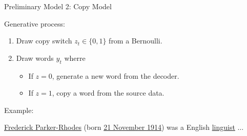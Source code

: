 



\begin{frame}{Preliminary Model 2: Copy Model}

Generative process:
\begin{enumerate}
\item Draw copy switch $z_t \in \{0, 1\}$ from a Bernoulli.
\item Draw words $y_t$ wherre
\begin{itemize}
\item If $z = 0$, generate a new word from the decoder.
  \air
\item If $z = 1$, copy a word from the source data.
\end{itemize}

\end{enumerate}

\air
\air

Example:
\begin{center}
\underline{Frederick Parker-Rhodes} (born \underline{21 November
1914}) was a English \underline{linguist} $\ldots$


\end{center}
\end{frame}


